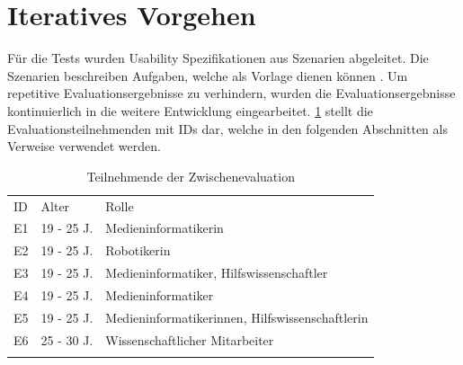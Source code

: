 \section{Iteratives Vorgehen}
Für die Tests wurden Usability Spezifikationen aus Szenarien abgeleitet. Die Szenarien beschreiben
Aufgaben, welche als Vorlage dienen können . Um repetitive Evaluationsergebnisse zu verhindern, wurden
die Evaluationsergebnisse kontinuierlich in die weitere Entwicklung eingearbeitet. \ref{table:e}
stellt die Evaluationsteilnehmenden mit IDs dar, welche in den folgenden Abschnitten als Verweise
verwendet werden.

\begin{table}[h]
    \centering
    \caption{Teilnehmende der Zwischenevaluation}
    \begin{tabular}{lll}
        \arrayrulecolor{maincolor}\hline
        \sffamily\color{maincolor}ID & \sffamily\color{maincolor}Alter &
        \sffamily\color{maincolor}Rolle                                                                           \\
        \arrayrulecolor{maincolor}\hline
        E1                           & 19 - 25 J.                      &
        Medieninformatikerin                                                                                      \\
        E2                           & 19 - 25 J.                      & Robotikerin                              \\
        E3                           & 19 - 25 J.                      & Medieninformatiker, Hilfswissenschaftler \\
        E4                           & 19 - 25 J.                      & Medieninformatiker                       \\
        E5                           & 19 - 25 J.                      &
        Medieninformatikerinnen, Hilfswissenschaftlerin                                                           \\
        E6                           & 25 - 30 J.                      & Wissenschaftlicher Mitarbeiter           \\
        \arrayrulecolor{maincolor}\hline
    \end{tabular}
    \label{table:e}
\end{table}

